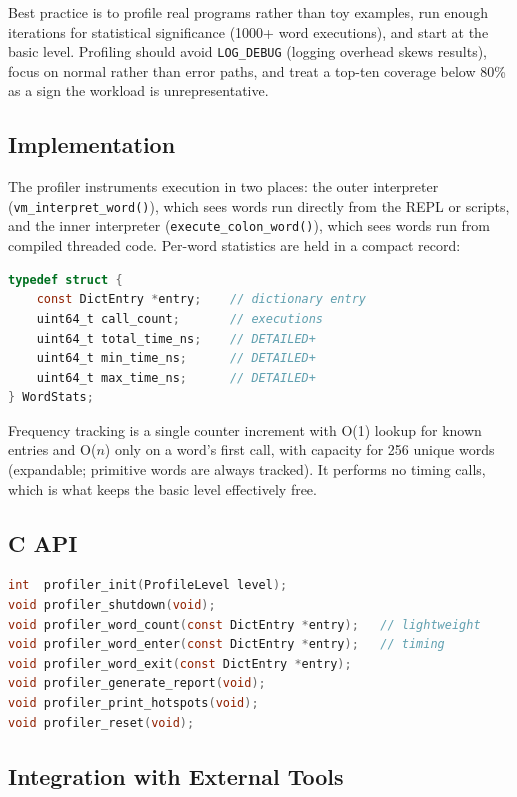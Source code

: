 Best practice is to profile real programs rather than toy examples, run enough
iterations for statistical significance (1000+ word executions), and start at
the basic level. Profiling should avoid \texttt{LOG\_DEBUG} (logging overhead
skews results), focus on normal rather than error paths, and treat a top-ten
coverage below 80\% as a sign the workload is unrepresentative.

\subsection{Implementation}

The profiler instruments execution in two places: the outer interpreter
(\texttt{vm\_interpret\_word()}), which sees words run directly from the REPL or
scripts, and the inner interpreter (\texttt{execute\_colon\_word()}), which sees
words run from compiled threaded code. Per-word statistics are held in a
compact record:

\begin{lstlisting}[language=C]
typedef struct {
    const DictEntry *entry;    // dictionary entry
    uint64_t call_count;       // executions
    uint64_t total_time_ns;    // DETAILED+
    uint64_t min_time_ns;      // DETAILED+
    uint64_t max_time_ns;      // DETAILED+
} WordStats;
\end{lstlisting}

Frequency tracking is a single counter increment with O(1) lookup for known
entries and O($n$) only on a word's first call, with capacity for 256 unique
words (expandable; primitive words are always tracked). It performs no timing
calls, which is what keeps the basic level effectively free.

\subsection{C API}

\begin{lstlisting}[language=C]
int  profiler_init(ProfileLevel level);
void profiler_shutdown(void);
void profiler_word_count(const DictEntry *entry);   // lightweight
void profiler_word_enter(const DictEntry *entry);   // timing
void profiler_word_exit(const DictEntry *entry);
void profiler_generate_report(void);
void profiler_print_hotspots(void);
void profiler_reset(void);
\end{lstlisting}

\subsection{Integration with External Tools}

